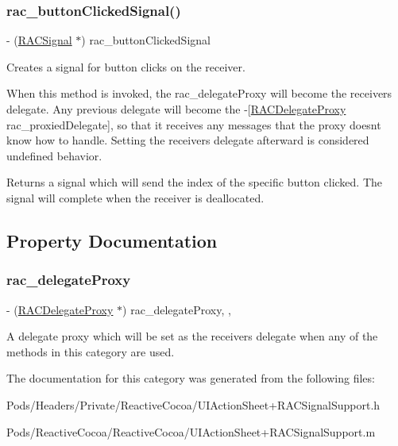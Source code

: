 \subsubsection{\texorpdfstring{rac\+\_\+button\+Clicked\+Signal()}{rac\_buttonClickedSignal()}\hspace{0.1cm}{\footnotesize\ttfamily [3/3]}}
{\footnotesize\ttfamily -\/ (\mbox{\hyperlink{interface_r_a_c_signal}{R\+A\+C\+Signal}} $\ast$) rac\+\_\+button\+Clicked\+Signal \begin{DoxyParamCaption}{ }\end{DoxyParamCaption}}

Creates a signal for button clicks on the receiver.

When this method is invoked, the {\ttfamily rac\+\_\+delegate\+Proxy} will become the receiver\textquotesingle{}s delegate. Any previous delegate will become the -\/\mbox{[}\mbox{\hyperlink{interface_r_a_c_delegate_proxy}{R\+A\+C\+Delegate\+Proxy}} rac\+\_\+proxied\+Delegate\mbox{]}, so that it receives any messages that the proxy doesn\textquotesingle{}t know how to handle. Setting the receiver\textquotesingle{}s {\ttfamily delegate} afterward is considered undefined behavior.

Returns a signal which will send the index of the specific button clicked. The signal will complete when the receiver is deallocated. 

\subsection{Property Documentation}
\mbox{\label{category_u_i_action_sheet_07_r_a_c_signal_support_08_a193e14324507d876cfc00fe2f5614193}} 
\subsubsection{\texorpdfstring{rac\+\_\+delegate\+Proxy}{rac\_delegateProxy}}
{\footnotesize\ttfamily -\/ (\mbox{\hyperlink{interface_r_a_c_delegate_proxy}{R\+A\+C\+Delegate\+Proxy}} $\ast$) rac\+\_\+delegate\+Proxy\hspace{0.3cm}{\ttfamily [read]}, {\ttfamily [nonatomic]}, {\ttfamily [strong]}}

A delegate proxy which will be set as the receiver\textquotesingle{}s delegate when any of the methods in this category are used. 

The documentation for this category was generated from the following files\+:\begin{DoxyCompactItemize}
\item 
Pods/\+Headers/\+Private/\+Reactive\+Cocoa/U\+I\+Action\+Sheet+\+R\+A\+C\+Signal\+Support.\+h\item 
Pods/\+Reactive\+Cocoa/\+Reactive\+Cocoa/U\+I\+Action\+Sheet+\+R\+A\+C\+Signal\+Support.\+m\end{DoxyCompactItemize}
